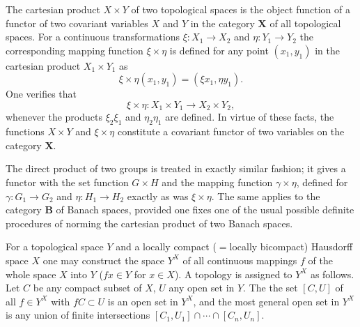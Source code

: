 \documentclass[11pt,a4paper]{report}
\begin{document}
The cartesian product $X\times Y$ of two topological spaces is the object function of a functor of two
covariant variables $X$ and $Y$ in the category $\mathbf{X}$ of all topological spaces. For a continuous
transformations $\xi:X_1\rightarrow X_2$ and $\eta:Y_1\rightarrow Y_2$ the corresponding mapping function
$\xi\times\eta$ is defined for any point $(x_1,y_1)$ in the cartesian product $X_1\times Y_1$ as
\begin{equation*}
	\xi\times\eta(x_1,y_1)= (\xi x_1,\eta y_1).
\end{equation*}
One verifies that
\begin{equation*}
	\xi\times\eta:X_1\times Y_1\rightarrow X_2\times Y_2,
\end{equation*}
whenever the products $\xi_2\xi_1$ and $\eta_2\eta_1$ are defined. In virtue of these facts, the functions
$X\times Y$ and $\xi\times\eta$ constitute a covariant functor of two variables on the category $\mathbf{X}$.

The direct product of two groups is treated in exactly similar fashion; it gives a functor with the set function
$G\times H$ and the mapping function $\gamma\times\eta$, defined for $\gamma:G_1\rightarrow G_2$ and 
$\eta:H_1\rightarrow H_2$ exactly as was $\xi\times\eta$. The same applies to the category $\mathbf{B}$ of Banach
spaces, provided one fixes one of the usual possible definite procedures of norming the cartesian product of two
Banach spaces.

For a topological space $Y$ and a locally compact ($=$locally bicompact) Hausdorff space $X$ one may construct the
space $Y^X$ of all continuous mappings $f$ of the whole space $X$ into $Y$ ($f x\in Y$ for $x\in X$). A topology is
assigned to $Y^X$ as follows. Let $C$ be any compact subset of $X$, $U$ any open set in $Y$. The the set $[C,U]$ of
all $f\in Y^X$ with $f C\subset U$ is an open set in $Y^X$, and the most general open set in $Y^X$ is any union of 
finite intersections $[C_1,U_1]\cap\dotsm\cap [C_n,U_n]$.
\end{document}
